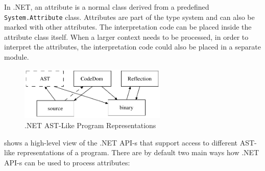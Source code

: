 In .NET, an attribute is a normal class derived from a predefined \texttt{Sy\-stem.Attri\-bu\-te} class. Attributes are part of the type system and can also be marked with other attributes. The interpretation code can be placed inside the attribute class itself. When a larger context needs to be processed, in order to interpret the attributes, the interpretation code could also be placed in a separate module. 

\begin{figure}[ht]
	\begin{center}
		\includegraphics[width=7cm,height=!]{ch03/existing}
	\end{center}
	\caption{.NET AST-Like Program Representations}
	\label{fig.existing}
\end{figure}

 shows a high-level view of the .NET API-s that support access to different AST-like representations of a program. There are by default two main ways how .NET API-s can be used to process attributes:


